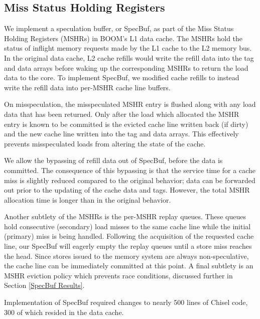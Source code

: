 \subsection{Miss Status Holding Registers}
We implement a speculation buffer, or SpecBuf, as part of the Miss Status Holding Registers (MSHRs) in BOOM's L1 data cache. The MSHRs hold the status of inflight memory requests made by the L1 cache to the L2 memory bus.
In the original data cache, L2 cache refills would write the refill data into the tag and data arrays before waking up the corresponding MSHRs to return the load data to the core.
To implement SpecBuf, we modified cache refills to instead write the refill data into per-MSHR cache line buffers.

On misspeculation, the misspeculated MSHR entry is flushed along with any load data that has been returned. Only after the load which allocated the MSHR entry is known to be committed is the evicted cache line written back (if dirty) and the new cache line written into the tag and data arrays. This effectively prevents misspeculated loads from altering the state of the cache.

We allow the bypassing of refill data out of SpecBuf, before the data is committed. The consequence of this bypassing is that the service time for a cache miss is slightly reduced compared to the original behavior; data can be forwarded out prior to the updating of the cache data and tags. However, the total MSHR allocation time is longer than in the original behavior.

Another subtlety of the MSHRs is the per-MSHR replay queues. These queues hold consecutive (secondary) load misses to the same cache line while the initial (primary) miss is being handled. Following the acquisition of the requested cache line, our SpecBuf will eagerly empty the replay queues until a store miss reaches the head. Since stores issued to the memory system are always non-speculative, the cache line can be immediately committed at this point. A final subtlety is an MSHR eviction policy which prevents race conditions, discussed further in Section \ref{SpecBuf Results}.

Implementation of SpecBuf required changes to nearly 500 lines of Chisel code, 300 of which resided in the data cache.

